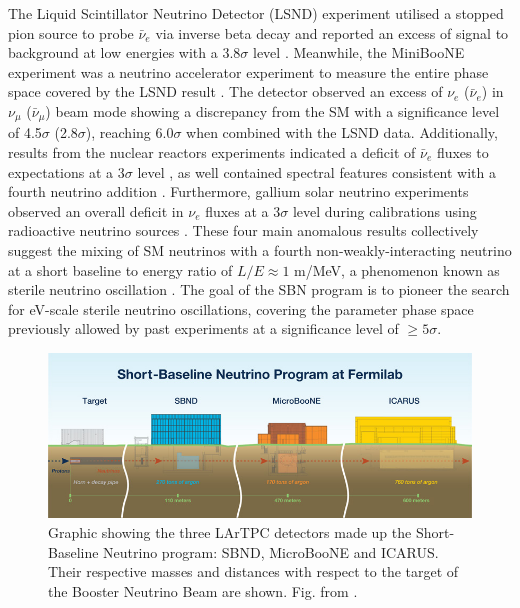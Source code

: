 The Liquid Scintillator Neutrino Detector (LSND) experiment utilised a stopped pion source to probe $\bar{\nu}_{e}$ via inverse beta decay and reported an excess of signal to background at low energies with a 3.8$\sigma$ level \cite{LSND_anomaly}. 
Meanwhile, the MiniBooNE experiment was a neutrino accelerator experiment to measure the entire phase space covered by the LSND result \cite{Miniboone_anomaly}.
The detector observed an excess of $\nu_{e}$ ($\bar{\nu}_{e}$) in $\nu_{\mu}$ ($\bar{\nu}_{\mu}$) beam mode showing a discrepancy from the SM with a significance level of 4.5$\sigma$ (2.8$\sigma$), reaching 6.0$\sigma$ when combined with the LSND data.
Additionally, results from the nuclear reactors experiments indicated a deficit of $\bar{\nu}_{e}$ fluxes to expectations at a 3$\sigma$ level \cite{reactor_anomaly_1, reactor_anomaly_2}, as well contained spectral features consistent with a fourth neutrino addition \cite{reactor_anomaly_3, reactor_anomaly_4}.
Furthermore, gallium solar neutrino experiments observed an overall deficit in $\nu_{e}$ fluxes at a 3$\sigma$ level during calibrations using radioactive neutrino sources \cite{galium_anomaly_1, galium_anomaly_2}.
These four main anomalous results collectively suggest the mixing of SM neutrinos with a fourth non-weakly-interacting neutrino at a short baseline to energy ratio of $L/E \approx 1 $ m/MeV, a phenomenon known as sterile neutrino oscillation \cite{SBNProgram}.
The goal of the SBN program is to pioneer the search for eV-scale sterile neutrino oscillations,  covering the parameter phase space previously allowed by past experiments at a significance level of $\geq 5 \sigma$.

\begin{figure}[htbp] 
\centering    
\includegraphics[width=1.0\textwidth]{SBN_program}
\caption[SBN_program]{
Graphic showing the three LArTPC detectors made up the Short-Baseline Neutrino program: SBND, MicroBooNE and ICARUS.
Their respective masses and distances with respect to the target of the Booster Neutrino Beam are shown.
Fig. from \cite{SBNProgram}.
}
\label{fig:SBN_program}
\end{figure}

